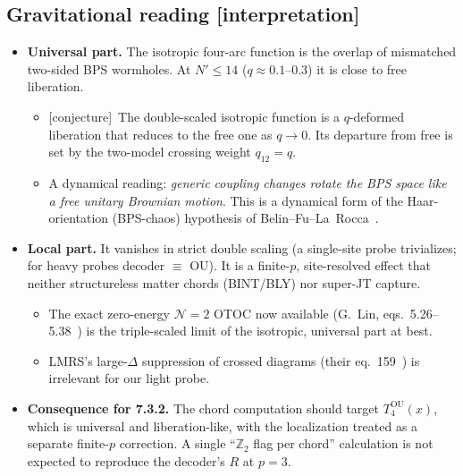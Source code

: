 \documentclass[11pt]{article}
\newcommand{\Np}{N'}
\newcommand{\OU}{\mathrm{OU}}
\newcommand{\tagbox}[2]{\textsf{\small\color{#1}[#2]}}
\newcommand{\CONJ}{\tagbox{cconj}{conjecture}}
\newcommand{\INTERP}{\tagbox{cconj}{interpretation}}
\theoremstyle{remark}
\begin{document}
\subsection{Gravitational reading \INTERP}
\begin{itemize}\itemsep1pt
\item \textbf{Universal part.} The isotropic four-arc function is the overlap of mismatched two-sided BPS wormholes. At
  $\Np\le14$ ($q\approx0.1$--0.3) it is close to free liberation.
  \begin{itemize}\itemsep1pt
  \item \CONJ\ The double-scaled isotropic function is a $q$-deformed liberation that reduces to the free one as $q\to0$.
    Its departure from free is set by the two-model crossing weight $q_{12}=q$.
  \item A dynamical reading: \emph{generic coupling changes rotate the BPS space like a free unitary Brownian motion}.
    This is a dynamical form of the Haar-orientation (BPS-chaos) hypothesis of Belin--Fu--La~Rocca~\cite{BFL}.
  \end{itemize}
\item \textbf{Local part.} It vanishes in strict double scaling (a single-site probe trivializes; for heavy probes
  decoder $\equiv$ OU). It is a finite-$p$, site-resolved effect that neither structureless matter chords (BINT/BLY) nor
  super-JT capture.
  \begin{itemize}\itemsep1pt
  \item The exact zero-energy $\mathcal N=2$ OTOC now available (G.~Lin, eqs.~5.26--5.38~\cite{GLin}) is the
    triple-scaled limit of the isotropic, universal part at best.
  \item LMRS's large-$\Delta$ suppression of crossed diagrams (their eq.~159~\cite{LMRS}) is irrelevant for our light
    probe.
  \end{itemize}
\item \textbf{Consequence for 7.3.2.} The chord computation should target $T_4^\OU(x)$, which is universal and
  liberation-like, with the localization treated as a separate finite-$p$ correction. A single ``$\mathbb Z_2$ flag per
  chord'' calculation is not expected to reproduce the decoder's $R$ at $p=3$.
\end{itemize}
\end{document}
